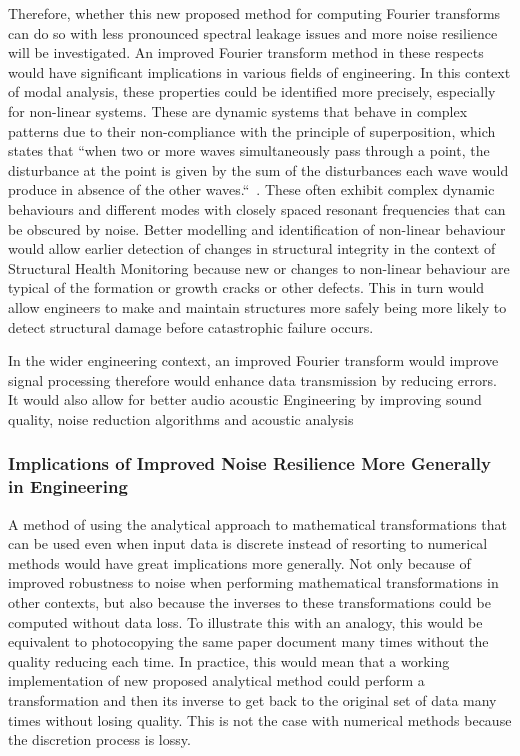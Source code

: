 \documentclass[12pt]{article}
\begin{document}
    Therefore, whether this new proposed method for computing Fourier transforms can do so with less pronounced spectral leakage issues and more noise resilience will be investigated.
    An improved Fourier transform method in these respects would have significant implications in various fields of engineering.
    In this context of modal analysis, these properties could be identified more precisely, especially for non-linear systems.
    These are dynamic systems that behave in complex patterns due to their non-compliance with the principle of superposition, which states that ``when two or more waves simultaneously pass through a point, the disturbance at the point is given by the sum of the disturbances each wave would produce in absence of the other waves.``~\cite{StudyComSuperposition}.
    These often exhibit complex dynamic behaviours and different modes with closely spaced resonant frequencies that can be obscured by noise.
    Better modelling and identification of non-linear behaviour would allow earlier detection of changes in structural integrity in the context of Structural Health Monitoring because new or changes to non-linear behaviour are typical of the formation or growth cracks or other defects.
    This in turn would allow engineers to make and maintain structures more safely being more likely to detect structural damage before catastrophic failure occurs.

    In the wider engineering context, an improved Fourier transform would improve signal processing therefore would enhance data transmission by reducing errors.
    It would also allow for better audio acoustic Engineering by improving sound quality, noise reduction algorithms and acoustic analysis

    \subsubsection{Implications of Improved Noise Resilience More Generally in Engineering}

    A method of using the analytical approach to mathematical transformations that can be used even when input data is discrete instead of resorting to numerical methods would have great implications more generally.
    Not only because of improved robustness to noise when performing mathematical transformations in other contexts, but also because  the inverses to these transformations could be computed without data loss.
    To illustrate this with an analogy, this would be equivalent to photocopying the same paper document many times without the quality reducing each time.
    In practice, this would mean that a working implementation of new proposed analytical method could perform a transformation and then its inverse to get back to the original set of data many times without losing quality.
    This is not the case with numerical methods because the discretion process is lossy.
\end{document}
